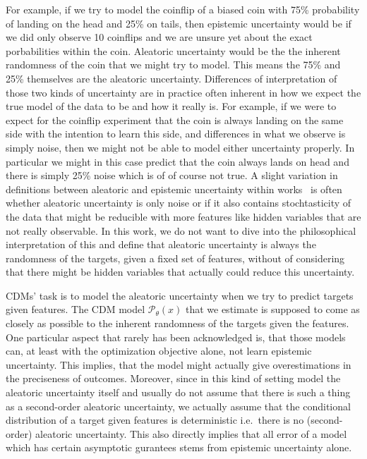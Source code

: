 For example, if we try to model the coinflip of a biased coin with 75\% probability of landing on the head and 25\% on tails, then epistemic uncertainty would be if we did only observe 10 coinflips and we are unsure yet about the exact porbabilities within the coin. Aleatoric uncertainty would be the the inherent randomness of the coin that we might try to model. This means the 75\% and 25\% themselves are the aleatoric uncertainty.
Differences of interpretation of those two kinds of uncertainty are in practice often inherent in how we expect the true model of the data to be and how it really is. For example, if we were to expect for the coinflip experiment that the coin is always landing on the same side with the intention to learn this side, and differences in what we observe is simply noise, then we might not be able to model either uncertainty properly. In particular we might in this case predict that the coin always lands on head and there is simply 25\% noise which is of of course not true.
A slight variation in definitions between aleatoric and epistemic uncertainty within works~\cite{hullermeier_aleatoric_2021} is often whether aleatoric uncertainty is only noise or if it also contains stochtasticity of the data that might be reducible with more features like hidden variables that are not really observable. In this work, we do not want to dive into the philosophical interpretation of this and define that aleatoric uncertainty is always the randomness of the targets, given a fixed set of features, without of considering that there might be hidden variables that actually could reduce this uncertainty.

CDMs' task is to model the aleatoric uncertainty when we try to predict targets given features. The CDM model $\mathscr{P}_\theta(x)$ that we estimate is supposed to come as closely as possible to the inherent randomness of the targets given the features. One particular aspect that rarely has been acknowledged is, that those models can, at least with the optimization objective alone, not learn epistemic uncertainty. This implies, that the model might actually give overestimations in the preciseness of outcomes. Moreover, since in this kind of setting model the aleatoric uncertainty itself and usually do not assume that there is such a thing as a second-order aleatoric uncertainty, we actually assume that the conditional distribution of a target given features is deterministic i.e.\ there is no (second-order) aleatoric uncertainty. This also directly implies that all error of a model which has certain asymptotic gurantees stems from epistemic uncertainty alone.

